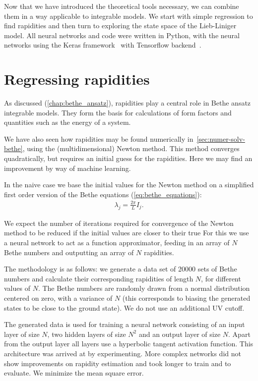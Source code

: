 \documentclass[11pt, a4paper]{report} %
\begin{document}
Now that we have introduced the theoretical tools necessary, we can combine them in a way applicable to integrable models.
We start with simple regression to find rapidities and then turn to exploring the state space of the Lieb-Liniger model.
All neural networks and code were written in Python, with the neural networks using the Keras framework~\cite{chollet2015keras} with Tensorflow backend~\cite{tensorflow2015-whitepaper}.

\section{Regressing rapidities}

As discussed (\cref{chap:bethe_ansatz}), rapidities play a central role in Bethe ansatz integrable models.
They form the basis for calculations of form factors and quantities such as the energy of a system.

We have also seen how rapidities may be found numerically in~\cref{sec:numer-solv-bethe}, using the (multidimensional) Newton method.
This method converges quadratically, but requires an initial guess for the rapidities.
Here we may find an improvement by way of machine learning.

In the naive case we base the initial values for the Newton method on a simplified first order version of the Bethe equations (\cref{eq:bethe_equations}):
\begin{align}
  \label{eq:12}
  \lambda_j = \frac{2\pi}{L} I_j.
\end{align}

We expect the number of iterations required for convergence of the Newton method to be reduced if the initial values are closer to their true 
For this we use a neural network to act as a function approximator, feeding in an array of \(N\) Bethe numbers and outputting an array of \(N\) rapidities.

The methodology is as follows: we generate a data set of 20000 sets of Bethe numbers and calculate their corresponding rapidities of length \(N\), for different values of \(N\).
The Bethe numbers are randomly drawn from a normal distribution centered on zero, with a variance of \(N\) (this corresponds to biasing the generated states to be close to the ground state).
We do not use an additional UV cutoff.

The generated data is used for training a neural network consisting of an input layer of size \(N\), two hidden layers of size \(N^2\) and an output layer of size \(N\).
Apart from the output layer all layers use a hyperbolic tangent activation function.
This architecture was arrived at by experimenting.
More complex networks did not show improvements on rapidity estimation and took longer to train and to evaluate.
We minimize the mean square error.
\end{document}
